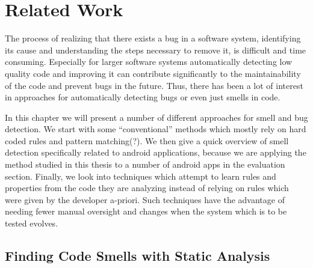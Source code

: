 \chapter{Related Work}\label{ch:relWork}



The process of realizing that there exists a bug in a software system, identifying its cause and understanding the steps necessary to remove it, is difficult and time consuming.
Especially for larger software systems automatically detecting low quality code and improving it can contribute significantly to the maintainability of the code and prevent bugs in the future.
Thus, there has been a lot of interest in approaches for automatically detecting bugs or even just smells in code.

In this chapter we will present a number of different approaches for smell and bug detection.
We start with some ``conventional'' methods which mostly rely on hard coded rules and pattern matching(?).
We then give a quick overview of smell detection specifically related to android applications, because we are applying the method studied in this thesis to a number of android apps in the evaluation section.
Finally, we look into techniques which attempt to learn rules and properties from the code they are analyzing instead of relying on rules which were given by the developer a-priori.
Such techniques have the advantage of needing fewer manual oversight and changes when the system which is to be tested evolves.

\section{Finding Code Smells with Static Analysis}

